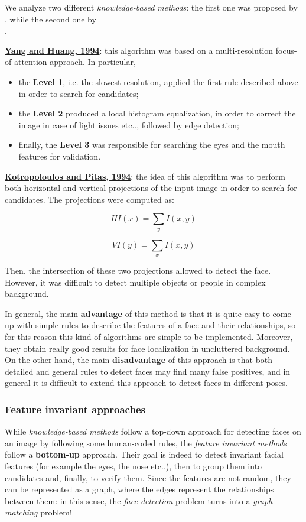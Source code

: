 We analyze two different \textit{knowledge-based methods}: the first one was proposed by \\ \cite{YANG199453}, while the second one by \\ \cite{kotropoulos1994nonlinear}.

\underline{\textbf{Yang and Huang, 1994}}: this algorithm was based on a multi-resolution focus-of-attention approach. In particular,

\begin{itemize}
    \item the \textbf{Level 1}, i.e. the slowest resolution, applied the first rule described above in order to search for candidates;
    \item the \textbf{Level 2} produced a local histogram equalization, in order to correct the image in case of light issues etc.., followed by edge detection;
    \item finally, the \textbf{Level 3} was responsible for searching the eyes and the mouth features for validation.
\end{itemize}

\underline{\textbf{Kotropoloulos and Pitas, 1994}}: the idea of this algorithm was to perform both horizontal and vertical projections of the input image in order to search for candidates. The projections were computed as:

$$
HI(x) = \sum_y I(x,y)
$$

$$
VI(y) = \sum_x I(x,y)
$$

Then, the intersection of these two projections allowed to detect the face. However, it was difficult to detect multiple objects or people in complex background.

In general, the main \textbf{advantage} of this method is that it is quite easy to come up with simple rules to describe the features of a face and their relationships, so for this reason this kind of algorithms are simple to be implemented. Moreover, they obtain really good results for face localization in uncluttered background. On the other hand, the main \textbf{disadvantage} of this approach is that both detailed and general rules to detect faces may find many false positives, and in general it is difficult to extend this approach to detect faces in different poses.

\subsubsection{Feature invariant approaches}
While \textit{knowledge-based methods} follow a top-down approach for detecting faces on an image by following some human-coded rules, the \textit{feature invariant methods} follow a \textbf{bottom-up} approach. Their goal is indeed to detect invariant facial features (for example the eyes, the nose etc..), 
 then to group them into candidates and, finally, to verify them. Since the features are not random, they can be represented as a graph, where the edges represent the relationships between them: in this sense, the \textit{face detection} problem turns into a \textit{graph matching} problem!

